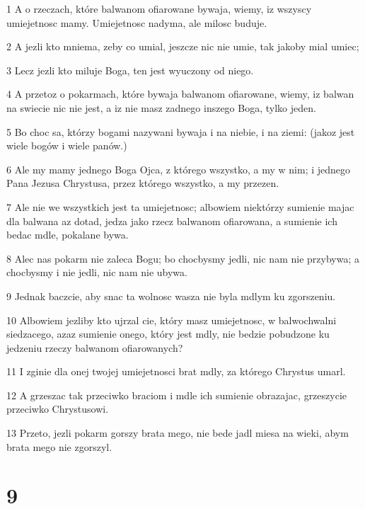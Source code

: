\par 1 A o rzeczach, które balwanom ofiarowane bywaja, wiemy, iz wszyscy umiejetnosc mamy. Umiejetnosc nadyma, ale milosc buduje.
\par 2 A jezli kto mniema, zeby co umial, jeszcze nic nie umie, tak jakoby mial umiec;
\par 3 Lecz jezli kto miluje Boga, ten jest wyuczony od niego.
\par 4 A przetoz o pokarmach, które bywaja balwanom ofiarowane, wiemy, iz balwan na swiecie nic nie jest, a iz nie masz zadnego inszego Boga, tylko jeden.
\par 5 Bo choc sa, którzy bogami nazywani bywaja i na niebie, i na ziemi: (jakoz jest wiele bogów i wiele panów.)
\par 6 Ale my mamy jednego Boga Ojca, z którego wszystko, a my w nim; i jednego Pana Jezusa Chrystusa, przez którego wszystko, a my przezen.
\par 7 Ale nie we wszystkich jest ta umiejetnosc; albowiem niektórzy sumienie majac dla balwana az dotad, jedza jako rzecz balwanom ofiarowana, a sumienie ich bedac mdle, pokalane bywa.
\par 8 Alec nas pokarm nie zaleca Bogu; bo chocbysmy jedli, nic nam nie przybywa; a chocbysmy i nie jedli, nic nam nie ubywa.
\par 9 Jednak baczcie, aby snac ta wolnosc wasza nie byla mdlym ku zgorszeniu.
\par 10 Albowiem jezliby kto ujrzal cie, który masz umiejetnosc, w balwochwalni siedzacego, azaz sumienie onego, który jest mdly, nie bedzie pobudzone ku jedzeniu rzeczy balwanom ofiarowanych?
\par 11 I zginie dla onej twojej umiejetnosci brat mdly, za którego Chrystus umarl.
\par 12 A grzeszac tak przeciwko braciom i mdle ich sumienie obrazajac, grzeszycie przeciwko Chrystusowi.
\par 13 Przeto, jezli pokarm gorszy brata mego, nie bede jadl miesa na wieki, abym brata mego nie zgorszyl.

\chapter{9}

